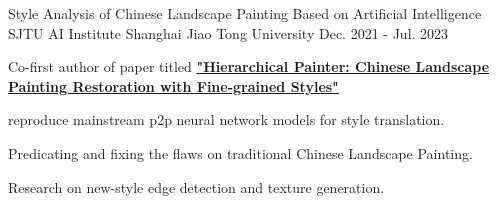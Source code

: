 \begin{cventries}
\begin{cventry}
  \end{cventry}

  \begin{cventry}
    {Style Analysis of Chinese Landscape Painting Based on Artificial Intelligence} %
    {SJTU AI Institute} %
    {Shanghai Jiao Tong University} %
    {Dec. 2021 - Jul. 2023} %
    {
      \begin{cvitems} %
      \item Co-first author of paper titled \href{https://link.springer.com/content/pdf/10.1007/s44267-023-00021-y.pdf}{\textbf{"Hierarchical Painter: Chinese Landscape Painting Restoration with Fine-grained Styles"}}
      \item reproduce mainstream p2p neural network models for style translation.
      \item Predicating and fixing the flaws on traditional Chinese Landscape Painting.
      \item Research on new-style edge detection and texture generation.
      \end{cvitems}
    }
  \end{cventry}
    

    
\end{cventries}

